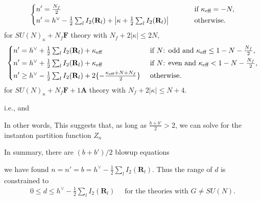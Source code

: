 \documentclass[letterpaper, 11pt]{article}
\newcommand{\nn}{\nonumber}
\def\k{\kappa}
\begin{document}
{\begin{align}
  \begin{dcases}
  n' = \textstyle \frac{N_f}{2}
  & \hspace{0.8cm} \textstyle\text{ if }  \kappa_\text{eff} = -N, \\
  n' = \textstyle h^\vee - \frac{1}{2} \sum_{l}I_2(\mathbf{R}_l) + \left|\k + \frac{1}{2}\sum_{l}I_2(\mathbf{R}_l)\right| 
  & \hspace{0.8cm} \textstyle\text{ otherwise} \nn.
  \end{dcases}
\end{align}
for $SU(N)_\kappa + N_f\mathbf{F}$ theory  with $N_f + 2|\kappa| \leq 2N$, 
\begin{align}
  \begin{dcases}
    n'  = \textstyle h^\vee + \frac{1}{2} \sum_{l}I_2(\mathbf{R}_l)  + \k_\text{eff} &  
     \textstyle\text{ if $N$: odd and }   \kappa_\text{eff} \leq 1-N - \frac{N_f}{2} ,\\
     n'  = \textstyle h^\vee + \frac{1}{2} \sum_{l}I_2(\mathbf{R}_l)  + \k_\text{eff} &  
     \textstyle\text{ if $N$: even and }   \kappa_\text{eff} < 1-N - \frac{N_f}{2},\\
     n'  \geq 
     \textstyle h^\vee - \frac{1}{2} \sum_{l}I_2(\mathbf{R}_l) + 2\{-\frac{\k_\text{eff}+N+N_f}{2}\}
     &  \textstyle\text{ otherwise}.
  \end{dcases}
\end{align} 
for $SU(N)_\kappa + N_f\mathbf{F} + 1\mathbf{A}$ theory with $N_f + 2|\kappa| \leq N+4$. 









\pagebreak

i.e.,   and 

In other words, This suggests that, as long as $\frac{b+b'}{2} > 2$, we can solve for the instanton partition function $Z_n$ 

In summary, there are $(b+b')/2$ blowup equations 



we have found   $n=n'=b = h^\vee  - \frac{1}{2}  \sum_{l}I_2(\mathbf{R}_l)$. Thus the range of $d$ is constrained to
\begin{align}
  \label{eq:bound-1}
  0  \leq d  \leq h^\vee  - \frac{1}{2}  \sum_{l}I_2(\mathbf{R}_l)  \quad \text{ for the theories with }  G\neq SU(N).
\end{align}





}
\end{document}

